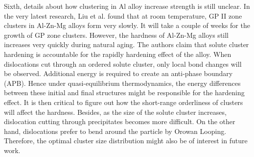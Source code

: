Sixth, details about how clustering in Al alloy increase strength is still unclear. In the very latest research, Liu et al. \cite{liu2020formation} found that at room temperature, \ac{GP} II zone clusters in Al-Zn-Mg alloys form very slowly. It will take a couple of weeks for the growth of \ac{GP} zone clusters. However, the hardness of Al-Zn-Mg alloys still increases very quickly during natural aging. The authors claim that solute cluster hardening is accountable for the rapidly hardening effect of the alloy. When dislocations cut through an ordered solute cluster, only local bond changes will be observed. Additional energy is required to create an anti-phase boundary (APB). Hence under quasi-equilibrium thermodynamics, the energy differences between these initial and final structures might be responsible for the hardening effect. It is then critical to figure out how the short-range orderliness of clusters will affect the hardness. Besides, as the size of the solute cluster increases, dislocation cutting through precipitates becomes more difficult. On the other hand, dislocations prefer to bend around the particle by Orowan Looping. Therefore, the optimal cluster size distribution might also be of interest in future work. 